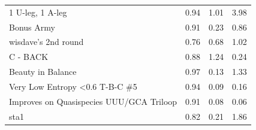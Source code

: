 \documentclass[letter]{bioinfo}
\begin{document}
\begin{center}
\begin{longtable}{l ccc}
1 U-leg, 1 A-leg				&0.94 	&1.01 	&3.98 \\
Bonus Army					&0.91 	&0.23 	&0.86 \\
wisdave's 2nd round			&0.76 	&0.68 	&1.02 \\
C - BACK						&0.88 	&1.24 	&0.24 \\
Beauty in Balance				&0.97 	&0.13 	&1.33 \\
Very Low Entropy <0.6 T-B-C \#5	&0.94 	&0.09 	&0.16 \\
Improves on Quasispecies UUU/GCA Triloop	&0.91 	&0.08 	&0.06 \\
sta1							&0.82 	&0.21 	&1.86 \\

\end{longtable}
\end{center}



\newpage



\end{document}
